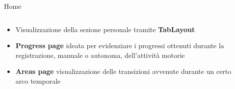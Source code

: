 \documentclass[10pt]{beamer}
\begin{document}
\begin{frame}{Home}
    \begin{columns}
        \begin{column}{0.5\textwidth}
            \hspace*{100pt}
            \begin{itemize}
                \item \small Visualizzazione della sezione personale tramite \textbf{TabLayout}
                \item \small \textbf{Progress page} ideata per evidenziare i progressi ottenuti durante la registrazione, manuale o autonoma, dell'attività motorie
                \item \small \textbf{Areas page} visualizzazione delle transizioni avvenute durante un certo arco temporale
            \end{itemize}
        \end{column}
        \begin{column}{0.5\textwidth}
            \begin{center}
            \end{center}
        \end{column}
    \end{columns}
\end{frame}
\end{document}
